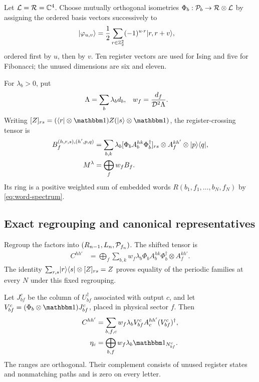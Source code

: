 Let $\mathcal{L}=\mathcal{R}=\mathbb{C}^4$. Choose mutually orthogonal isometries
$\Phi_b:\mathcal{P}_b\to\mathcal{R}\otimes\mathcal{L}$ by assigning the ordered
basis vectors successively to
\begin{align}
	\lvert\varphi_{u,v}\rangle
	 & =\frac12\sum_{r\in\mathbb{Z}_2^2}(-1)^{u\cdot r}\lvert r,r+v\rangle,
\end{align}
ordered first by $u$, then by $v$. Ten register vectors are used
for Ising and five for Fibonacci; the unused dimensions are six
and eleven.

For $\lambda_b>0$, put
\begin{align}
	\Lambda & =\sum_b\lambda_bd_b,         &
	w_f     & =\frac{d_f}{\mathcal{D}^2\Lambda}.
\end{align}
Writing $[Z]_{rs}=(\bra r\otimes\Id)Z(\ket s\otimes\Id)$,
the register-crossing tensor is
\begin{align}
	B_f^{(h,r,s),(h',p,q)}
	          & =\sum_{b,k}\lambda_b
	                       [\Phi_bA_b^{hk}\Phi_b^\dagger]_{rs}
	\otimes A_f^{kh'}\otimes\lvert p\rangle\langle q\rvert,                      \\
	M^\lambda & =\bigoplus_fw_fB_f.
	\label{eq:crossing-category}
\end{align}
Its ring is a positive weighted sum of embedded words
$R(b_1,f_1,\ldots,b_N,f_N)$ by \cref{eq:word-spectrum}.

\subsection{Exact regrouping and canonical representatives}

Regroup the factors into $(R_{n-1},L_n,\mathcal{P}_{f_n})$.
The shifted tensor is
\begin{align}
	C^{hh'}
	 & =\bigoplus_f\sum_{b,k}w_f\lambda_b
	\Phi_bA_b^{hk}\Phi_b^\dagger\otimes A_f^{kh'}.
	\label{eq:shift-category}
\end{align}
The identity
$\sum_{r,s}\lvert r\rangle\langle s\rvert\otimes[Z]_{rs}=Z$
proves equality of the periodic families at every $N$ under this
fixed regrouping.

Let $J_{bf}^{c}$ be the column of $U_{bf}^\dagger$ associated
with output $c$, and let
$V_{bf}^{c}=(\Phi_b\otimes\Id)J_{bf}^{c}$, placed in physical
sector $f$. Then
\begin{align}
	C^{hh'}
	 & =\sum_{b,f,c}w_f\lambda_b
	V_{bf}^{c}A_c^{hh'}(V_{bf}^{c})^\dagger,       \\
	\eta_c
	 & =\bigoplus_{b,f}w_f\lambda_b\Id_{N_{bf}^c}.
	\label{eq:category-eta}
\end{align}
The ranges are orthogonal. Their complement consists of unused
register states and nonmatching paths and is zero on every letter.

